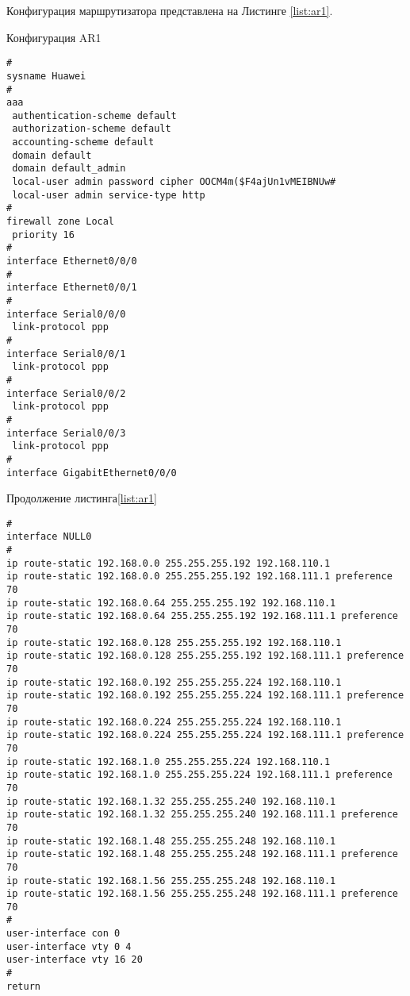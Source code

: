 \documentclass[14pt, a4paper]{extarticle}
\begin{document}
Конфигурация маршрутизатора представлена на Листинге \ref{list:ar1}.
\begin{listing}[H]
\caption{Конфигурация AR1\label{list:ar1}}
\begin{Verbatim}[frame=single, fontsize=\footnotesize]
#
sysname Huawei
#
aaa 
 authentication-scheme default
 authorization-scheme default
 accounting-scheme default
 domain default 
 domain default_admin 
 local-user admin password cipher OOCM4m($F4ajUn1vMEIBNUw#
 local-user admin service-type http
#
firewall zone Local
 priority 16
#
interface Ethernet0/0/0
#
interface Ethernet0/0/1
#
interface Serial0/0/0
 link-protocol ppp
#
interface Serial0/0/1
 link-protocol ppp
#
interface Serial0/0/2
 link-protocol ppp
#
interface Serial0/0/3
 link-protocol ppp
#
interface GigabitEthernet0/0/0
\end{Verbatim}
\end{listing}
\begin{listing}[H]
\caption*{Продолжение листинга\;\ref{list:ar1}}
\begin{Verbatim}[frame=single, fontsize=\footnotesize]
#
interface NULL0
#
ip route-static 192.168.0.0 255.255.255.192 192.168.110.1
ip route-static 192.168.0.0 255.255.255.192 192.168.111.1 preference 70
ip route-static 192.168.0.64 255.255.255.192 192.168.110.1
ip route-static 192.168.0.64 255.255.255.192 192.168.111.1 preference 70
ip route-static 192.168.0.128 255.255.255.192 192.168.110.1
ip route-static 192.168.0.128 255.255.255.192 192.168.111.1 preference 70
ip route-static 192.168.0.192 255.255.255.224 192.168.110.1
ip route-static 192.168.0.192 255.255.255.224 192.168.111.1 preference 70
ip route-static 192.168.0.224 255.255.255.224 192.168.110.1
ip route-static 192.168.0.224 255.255.255.224 192.168.111.1 preference 70
ip route-static 192.168.1.0 255.255.255.224 192.168.110.1
ip route-static 192.168.1.0 255.255.255.224 192.168.111.1 preference 70
ip route-static 192.168.1.32 255.255.255.240 192.168.110.1
ip route-static 192.168.1.32 255.255.255.240 192.168.111.1 preference 70
ip route-static 192.168.1.48 255.255.255.248 192.168.110.1
ip route-static 192.168.1.48 255.255.255.248 192.168.111.1 preference 70
ip route-static 192.168.1.56 255.255.255.248 192.168.110.1
ip route-static 192.168.1.56 255.255.255.248 192.168.111.1 preference 70
#
user-interface con 0
user-interface vty 0 4
user-interface vty 16 20
#
return 
\end{Verbatim}
\end{listing}
\newpage
\end{document}
